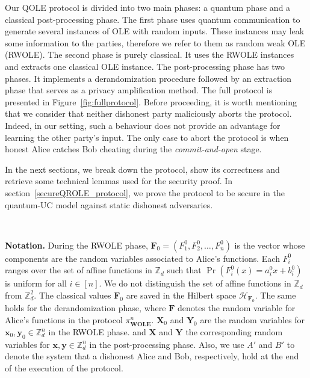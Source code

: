 Our QOLE protocol is divided into two main phases: a quantum phase and a classical post-processing phase. The first phase uses quantum communication to generate several instances of OLE with random inputs. These instances may leak some information to the parties, therefore we refer to them as random weak OLE (RWOLE). The second phase is purely classical. It uses the RWOLE instances and extracts one classical OLE instance. The post-processing phase has two phases. It implements a derandomization procedure followed by an extraction phase that serves as a privacy amplification method. The full protocol is presented in Figure~\ref{fig:fullprotocol}.  Before proceeding, it is worth mentioning that we consider that neither dishonest party maliciously aborts the protocol. Indeed, in our setting, such a behaviour does not provide an advantage for learning the other party's input. The only case to abort the protocol is when honest Alice catches Bob cheating during the \textit{commit-and-open} stage.  

In the next sections, we break down the protocol, show its correctness and retrieve some technical lemmas used for the security proof. In section~\ref{secureQROLE_protocol}, we prove the protocol to be secure in the quantum-UC model against static dishonest adversaries.

\

\noindent\textbf{Notation.}  During the RWOLE phase, $\mathbf{F}_0 = (F^0_1,F^0_2 ,\ldots, F^0_n)$ is the vector whose components are the  random variables associated to Alice's functions. Each  $F^0_i$ ranges over the set of affine functions in $\mathbb{Z}_d$ such that $\Pr(F^0_i(x)=a^0_ix+ b^0_i)$ is uniform for all $i\in [n]$. We do not distinguish the set of affine functions in $\mathbb{Z}_d$ from $\mathbb{Z}_d^2$. The classical values $\mathbf{F}_0$ are saved in the Hilbert space $\mathcal{H}_{\mathbf{F}_0}$. The same holds for the derandomization phase, where $\mathbf{F}$ denotes the random variable for Alice's functions in the protocol $\pi^n_{\textbf{WOLE}}$. $\textbf{X}_0$ and $\textbf{Y}_0$ are the random variables for $\textbf{x}_0, \textbf{y}_0 \in \mathbb{Z}^{ n}_d$  in the RWOLE phase. and $\textbf{X}$ and $\textbf{Y}$ the corresponding random variables for $\textbf{x}, \textbf{y} \in \mathbb{Z}^{n}_d$  in the post-processing phase. Also, we use $A'$ and $B'$ to denote the system that a dishonest Alice and Bob, respectively, hold at the end of the execution of the protocol.



%
%
%
